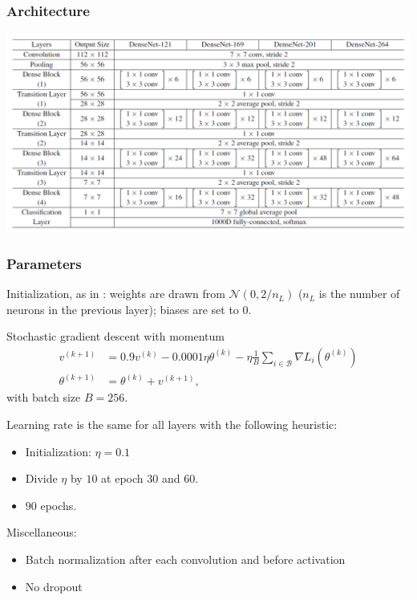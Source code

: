 \begin{frame}
	\frametitle{Architecture}
	
	\begin{center}
		\includegraphics[scale=0.65]{figs/densenet_architecture}
	\end{center}
\end{frame}




\begin{frame}
\frametitle{Parameters}

Initialization, as in \cite{he2015delving}: weights are drawn from $\mathcal{N}(0, 2/n_L)$ ($n_L$ is the number of neurons in the previous layer); biases are set to $0$. 


\begin{block}{Stochastic gradient descent with momentum}
	\begin{align*}
	v^{(k+1)} & = 0.9 v^{(k)} - 0.0001 \eta \theta^{(k)} - \eta \frac{1}{B} \sum_{i \in \mathcal{B}} \nabla L_i (\theta^{(k)})\\
	\theta^{(k+1)} & = \theta^{(k)} + v^{(k+1)},
	\end{align*}	
	with batch size $B= 256$. 
\end{block}



Learning rate is the same for all layers with the following heuristic: 
\begin{itemize}
	\item Initialization: $\eta = 0.1$
	\item Divide $\eta$ by $10$ at epoch $30$ and $60$.
	\item $90$ epochs.
\end{itemize}

Miscellaneous: 
\begin{itemize}
	\item Batch normalization after each convolution and before activation
	\item No dropout
\end{itemize}
\end{frame}

